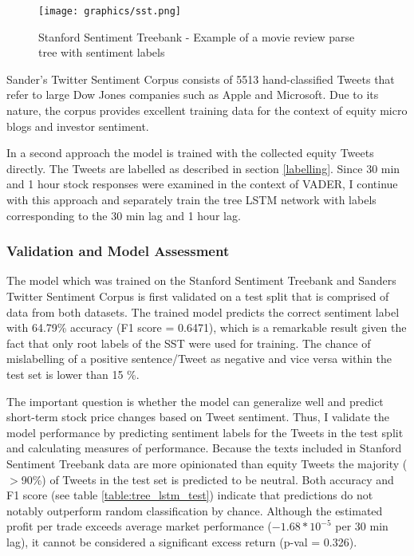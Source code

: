 \documentclass[a4paper,12pt]{article}%
\begin{document}
\begin{figure}
\captionsetup{justification=centering}
\centering
\texttt{[image: graphics/sst.png]}
\caption{Stanford Sentiment Treebank - Example of a movie review parse tree with sentiment labels \citep{Socher2013} \label{fig:sst}}
\end{figure}

Sander's Twitter Sentiment Corpus consists of 5513 hand-classified Tweets that refer to large Dow Jones companies such as Apple and Microsoft. Due to its nature, the corpus provides excellent training data for the context of equity micro blogs and investor sentiment.

In a second approach the model is trained with the collected equity Tweets directly. The Tweets are labelled as described in section \ref{labelling}. Since 30 min and 1 hour stock responses were examined in the context of VADER, I continue with this approach and separately train the tree LSTM network with labels corresponding to the 30 min lag and 1 hour lag.

\subsubsection{Validation and Model Assessment}
The model which was trained on the Stanford Sentiment Treebank and Sanders Twitter Sentiment Corpus is first validated on a test split that is comprised of data from both datasets. The trained model predicts the correct sentiment label with 64.79\% accuracy (F1 score =  0.6471), which is a remarkable result given the fact that only root labels of the SST were used for training. The chance of mislabelling of a positive sentence/Tweet as negative and vice versa within the test set is lower than 15 \%.

The important question is whether the model can generalize well and predict short-term stock price changes based on Tweet sentiment. Thus, I validate the model performance by predicting sentiment labels for the Tweets in the test split and calculating measures of performance. Because the texts included in Stanford Sentiment Treebank data are more opinionated than equity Tweets the majority ($>$90\%) of Tweets in the test set is predicted to be neutral. Both accuracy and F1 score (see table \ref{table:tree_lstm_test}) indicate that predictions do not notably outperform random classification by chance. Although the estimated profit per trade exceeds average market performance ($-1.68 * 10^{-5}$ per 30 min lag), it  cannot be considered a significant excess return (p-val = 0.326).
\end{document}

